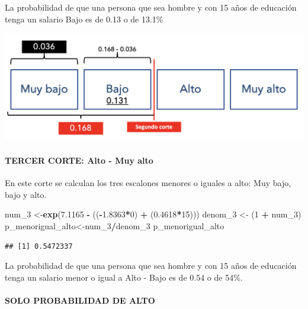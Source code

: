 \documentclass[
]{article}
\newenvironment{Shaded}{\begin{snugshade}}{\end{snugshade}}
\newcommand{\DecValTok}[1]{\textcolor[rgb]{0.00,0.00,0.81}{#1}}
\newcommand{\FloatTok}[1]{\textcolor[rgb]{0.00,0.00,0.81}{#1}}
\newcommand{\FunctionTok}[1]{\textcolor[rgb]{0.13,0.29,0.53}{\textbf{#1}}}
\newcommand{\NormalTok}[1]{#1}
\newcommand{\OtherTok}[1]{\textcolor[rgb]{0.56,0.35,0.01}{#1}}
\newcommand{\SpecialCharTok}[1]{\textcolor[rgb]{0.81,0.36,0.00}{\textbf{#1}}}
\begin{document}
La probabilidad de que una persona que sea hombre y con 15 años de
educación tenga un salario Bajo es de 0.13 o de 13.1\%

\begin{center}\includegraphics[width=0.8\linewidth]{pd5_corte2} \end{center}

\hypertarget{tercer-corte-alto---muy-alto}{%
\paragraph{\texorpdfstring{\textbf{TERCER CORTE: Alto - Muy
alto}}{TERCER CORTE: Alto - Muy alto}}\label{tercer-corte-alto---muy-alto}}

En este corte se calculan los tres escalones menores o iguales a alto:
Muy bajo, bajo y alto.

\begin{Shaded}
\begin{Highlighting}[]
\NormalTok{num\_3 }\OtherTok{\textless{}{-}}\FunctionTok{exp}\NormalTok{(}\FloatTok{7.1165} \SpecialCharTok{{-}}\NormalTok{ ((}\SpecialCharTok{{-}}\FloatTok{1.8363}\SpecialCharTok{*}\DecValTok{0}\NormalTok{) }\SpecialCharTok{+}\NormalTok{ (}\FloatTok{0.4618}\SpecialCharTok{*}\DecValTok{15}\NormalTok{)))}
\NormalTok{denom\_3 }\OtherTok{\textless{}{-}}\NormalTok{ (}\DecValTok{1} \SpecialCharTok{+}\NormalTok{ num\_3)}
\NormalTok{p\_menorigual\_alto}\OtherTok{\textless{}{-}}\NormalTok{num\_3}\SpecialCharTok{/}\NormalTok{denom\_3}
\NormalTok{p\_menorigual\_alto}
\end{Highlighting}
\end{Shaded}

\begin{verbatim}
## [1] 0.5472337
\end{verbatim}

La probabilidad de que una persona que sea hombre y con 15 años de
educación tenga un salario menor o igual a Alto - Bajo es de 0.54 o de
54\%.

\hypertarget{solo-probabilidad-de-alto}{%
\paragraph{SOLO PROBABILIDAD DE ALTO}\label{solo-probabilidad-de-alto}}
\end{document}
